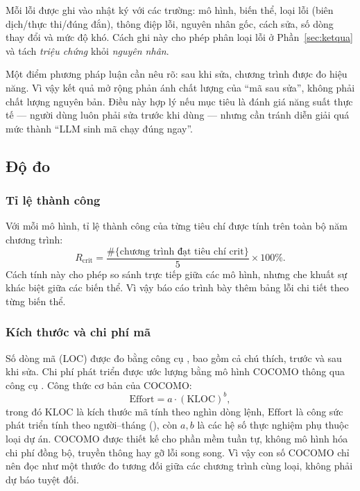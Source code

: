 Mỗi lỗi được ghi vào nhật ký với các trường: mô hình, biến thể, loại lỗi (biên
dịch/thực thi/đúng đắn), thông điệp lỗi, nguyên nhân gốc, cách sửa, số dòng thay
đổi và mức độ khó. Cách ghi này cho phép phân loại lỗi ở Phần~\ref{sec:ketqua}
và tách \emph{triệu chứng} khỏi \emph{nguyên nhân}.

Một điểm phương pháp luận cần nêu rõ: sau khi sửa, chương trình được đo hiệu
năng. Vì vậy kết quả mở rộng phản ánh chất lượng của “mã sau sửa”, không phải
chất lượng nguyên bản. Điều này hợp lý nếu mục tiêu là đánh giá năng suất thực
tế — người dùng luôn phải sửa trước khi dùng — nhưng cần tránh diễn giải quá mức
thành “LLM sinh mã chạy đúng ngay”.

\subsection{Độ đo}

\subsubsection{Tỉ lệ thành công}

Với mỗi mô hình, tỉ lệ thành công của từng tiêu chí được tính trên toàn bộ năm
chương trình:
\begin{equation}
  R_{\text{crit}} = \frac{\#\{\text{chương trình đạt tiêu chí crit}\}}{5}\times100\%.
\end{equation}
Cách tính này cho phép so sánh trực tiếp giữa các mô hình, nhưng che khuất sự
khác biệt giữa các biến thể. Vì vậy báo cáo trình bày thêm bảng lỗi chi tiết
theo từng biến thể.

\subsubsection{Kích thước và chi phí mã}

Số dòng mã (LOC) được đo bằng công cụ , bao gồm cả chú thích, trước
và sau khi sửa. Chi phí phát triển được ước lượng bằng mô hình COCOMO \cite{boehm1984} thông qua
công cụ . Công thức cơ bản của COCOMO:
\begin{equation}
  \text{Effort} = a \cdot (\text{KLOC})^{b},
\end{equation}
trong đó $\text{KLOC}$ là kích thước mã tính theo nghìn dòng lệnh, $\text{Effort}$
là công sức phát triển tính theo người--tháng (), còn $a,b$ là
các hệ số thực nghiệm phụ thuộc loại dự án. COCOMO được thiết kế cho phần mềm tuần
tự, không mô hình hóa chi phí đồng bộ, truyền thông hay gỡ lỗi song song. Vì vậy
con số COCOMO chỉ nên đọc như một thước đo tương đối giữa các chương trình cùng
loại, không phải dự báo tuyệt đối.

